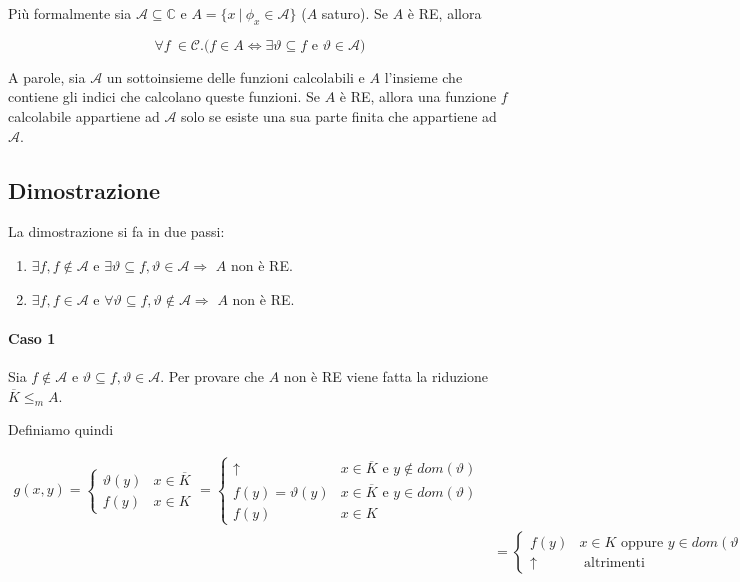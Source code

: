 Più formalmente sia $\mathcal{A}\subseteq \mathbb{C}$ e $A = \{x \: | \: \phi_x \in \mathcal{A} \}$ ($A$ saturo). Se $A$ è RE, allora

$$
\forall f \: \in \mathcal{C} . \bigg( f \in A \Leftrightarrow \exists \vartheta \subseteq f \text{ e } \vartheta \in \mathcal{A}  \bigg)
$$

A parole, sia $\mathcal{A}$ un sottoinsieme delle funzioni calcolabili e $A$ l'insieme che contiene gli indici che calcolano queste funzioni. Se $A$ è RE, allora una funzione $f$ calcolabile appartiene ad $\mathcal{A}$ solo se esiste una sua parte finita che appartiene ad $\mathcal{A}$.

\subsection{Dimostrazione}

La dimostrazione si fa in due passi:

\begin{enumerate}
	\item $\exists f, f \notin \mathcal{A}$ e $\exists \vartheta \subseteq f, \vartheta \in \mathcal{A} \Rightarrow$ $A$ non è RE.
	\item $\exists f, f \in \mathcal{A}$ e $\forall \vartheta \subseteq f, \vartheta \notin \mathcal{A} \Rightarrow$ $A$ non è RE.
\end{enumerate}

\paragraph{Caso 1}

Sia $f \notin \mathcal{A}$ e $\vartheta \subseteq f, \vartheta \in \mathcal{A}$. Per provare che $A$ non è RE viene fatta la riduzione $\overline{K} \leq_m A$.

Definiamo quindi 

\begin{align*}
	g(x,y) = \begin{cases}
		\vartheta(y) & x \in \overline{K} \\
		f(y) & x \in K
	\end{cases} = \begin{cases}
	\uparrow & x \in \overline{K} \text{ e } y \notin dom(\vartheta) \\
	f(y) = \vartheta(y)  & x \in \overline{K} \text{ e } y \in dom(\vartheta) \\
	f(y) & x \in K  
	\end{cases} \\
	&= \begin{cases}
	f(y) &x \in K \text{ oppure } y \in dom(\vartheta)\\
	\uparrow & \text{ altrimenti}
	\end{cases} 
\end{align*}


